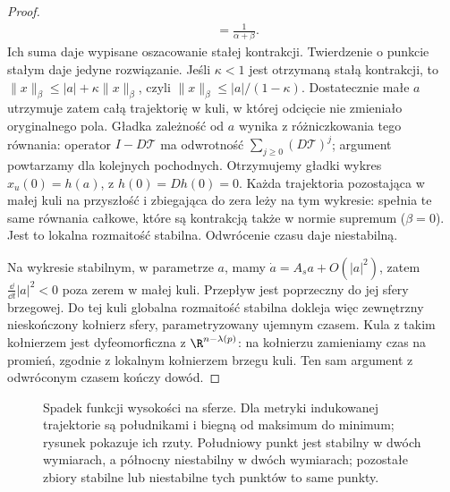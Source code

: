 \begin{proof}
\[\begin{aligned}
  &=\frac1{\alpha+\beta}.
 \end{aligned}
\]
Ich suma daje wypisane oszacowanie stałej kontrakcji.
Twierdzenie o punkcie stałym daje jedyne rozwiązanie.
Jeśli $\kappa<1$ jest otrzymaną stałą kontrakcji, to
$\|x\|_\beta\leq |a|+\kappa\|x\|_\beta$,
czyli $\|x\|_\beta\leq |a|/(1-\kappa)$.
Dostatecznie małe $a$ utrzymuje zatem całą trajektorię
w kuli, w której odcięcie nie zmieniało oryginalnego pola.
Gładka zależność od $a$ wynika z różniczkowania
tego równania: operator $I-D\mathcal T$ ma odwrotność
$\sum_{j\geq0}(D\mathcal T)^j$; argument powtarzamy
dla kolejnych pochodnych. Otrzymujemy gładki wykres
$x_u(0)=h(a)$, z $h(0)=Dh(0)=0$.
Każda trajektoria pozostająca w małej kuli na przyszłość
i zbiegająca do zera leży na tym wykresie:
spełnia te same równania całkowe, które są kontrakcją
także w normie supremum ($\beta=0$).
Jest to lokalna rozmaitość stabilna.
Odwrócenie czasu daje niestabilną.

Na wykresie stabilnym, w parametrze $a$, mamy
$\dot a=A_sa+O(|a|^2)$, zatem
$\frac{\dd}{\dd t}|a|^2<0$ poza zerem w małej kuli.
Przepływ jest poprzeczny do jej sfery brzegowej.
Do tej kuli globalna rozmaitość stabilna dokleja
więc zewnętrzny nieskończony kołnierz sfery,
parametryzowany ujemnym czasem. Kula z takim
kołnierzem jest dyfeomorficzna z $\R^{n-\lambda(p)}$:
na kołnierzu zamieniamy czas na promień,
zgodnie z lokalnym kołnierzem brzegu kuli.
Ten sam argument z odwróconym czasem kończy dowód.
\end{proof}

\begin{figure}[H]
\centering
{}
\caption{Spadek funkcji wysokości na sferze.
Dla metryki indukowanej trajektorie są południkami
i biegną od maksimum do minimum; rysunek pokazuje ich rzuty.
Południowy punkt jest stabilny w dwóch
wymiarach, a północny niestabilny w dwóch
wymiarach; pozostałe zbiory stabilne
lub niestabilne tych punktów to same punkty.}
\label{fig:przeplyw-morse-sfera-17}
\end{figure}

